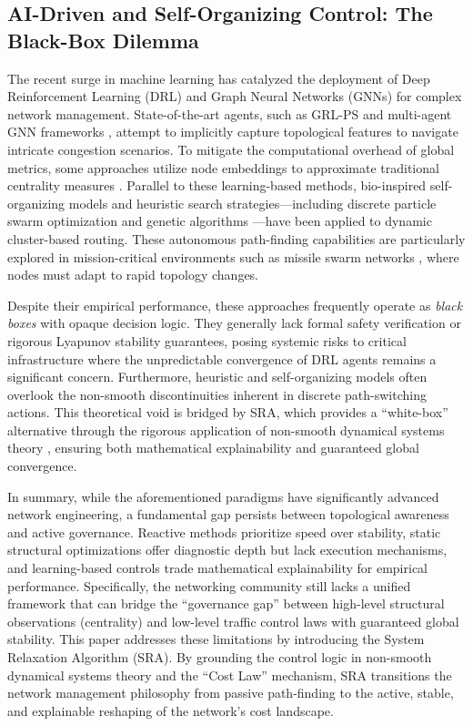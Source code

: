 \documentclass[journal]{IEEEtran}
\theoremstyle{plain}
\theoremstyle{definition}
\begin{document}
\subsection{AI-Driven and Self-Organizing Control: The Black-Box Dilemma}

The recent surge in machine learning has catalyzed the deployment of Deep Reinforcement Learning (DRL) and Graph Neural Networks (GNNs) for complex network management. State-of-the-art agents, such as GRL-PS \cite{Wei2023GRLPS} and multi-agent GNN frameworks \cite{Feng2025MultiAgentGNN}, attempt to implicitly capture topological features to navigate intricate congestion scenarios. To mitigate the computational overhead of global metrics, some approaches utilize node embeddings to approximate traditional centrality measures \cite{Mendonca2021ApproxCentrality}. Parallel to these learning-based methods, bio-inspired self-organizing models \cite{Cheng2010SelfOrganizingModel, Guo2010HybridSelfOrg, Li2014PhysarumMulticast} and heuristic search strategies---including discrete particle swarm optimization \cite{Wang2019DPSO} and genetic algorithms \cite{Mu2024CarrierSelfOrg}---have been applied to dynamic cluster-based routing. These autonomous path-finding capabilities are particularly explored in mission-critical environments such as missile swarm networks \cite{Lu2022MissileSwarm,ma2021credibility}, where nodes must adapt to rapid topology changes.

Despite their empirical performance, these approaches frequently operate as \textit{black boxes} with opaque decision logic. They generally lack formal safety verification or rigorous Lyapunov stability guarantees, posing systemic risks to critical infrastructure where the unpredictable convergence of DRL agents remains a significant concern. Furthermore, heuristic and self-organizing models often overlook the non-smooth discontinuities inherent in discrete path-switching actions. This theoretical void is bridged by SRA, which provides a ``white-box'' alternative through the rigorous application of non-smooth dynamical systems theory \cite{Aubin1984Differential}, ensuring both mathematical explainability and guaranteed global convergence.

In summary, while the aforementioned paradigms have significantly advanced network engineering, a fundamental gap persists between topological awareness and active governance. Reactive methods prioritize speed over stability, static structural optimizations offer diagnostic depth but lack execution mechanisms, and learning-based controls trade mathematical explainability for empirical performance. Specifically, the networking community still lacks a unified framework that can bridge the ``governance gap'' between high-level structural observations (centrality) and low-level traffic control laws with guaranteed global stability. This paper addresses these limitations by introducing the System Relaxation Algorithm (SRA). By grounding the control logic in non-smooth dynamical systems theory and the ``Cost Law'' mechanism, SRA transitions the network management philosophy from passive path-finding to the active, stable, and explainable reshaping of the network's cost landscape.
\end{document}
